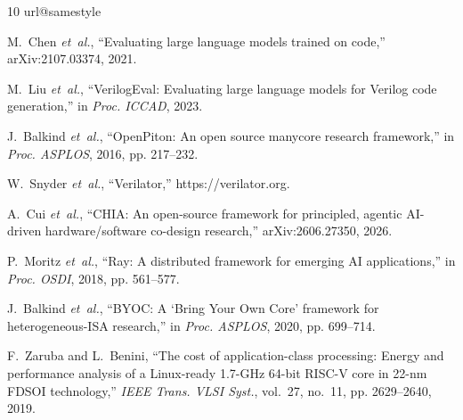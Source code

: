 \documentclass[10pt,conference,compsoc]{IEEEtran}
\begin{document}
\begin{thebibliography}{10}
\providecommand{\url}[1]{#1}
\csname url@samestyle\endcsname
\providecommand{\newblock}{\relax}
\providecommand{\bibinfo}[2]{#2}
\providecommand{\BIBentrySTDinterwordspacing}{\spaceskip=0pt\relax}
\providecommand{\BIBentryALTinterwordstretchfactor}{4}
\providecommand{\BIBentryALTinterwordspacing}{\spaceskip=\fontdimen2\font plus
\BIBentryALTinterwordstretchfactor\fontdimen3\font minus \fontdimen4\font\relax}
\providecommand{\BIBforeignlanguage}[2]{{%
\expandafter\ifx\csname l@#1\endcsname\relax
\typeout{** WARNING: IEEEtran.bst: No hyphenation pattern has been}%
\typeout{** loaded for the language `#1'. Using the pattern for}%
\typeout{** the default language instead.}%
\else
\language=\csname l@#1\endcsname
\fi
#2}}
\providecommand{\BIBdecl}{\relax}
\BIBdecl

M.~Chen \emph{et~al.}, ``Evaluating large language models trained on code,'' arXiv:2107.03374, 2021.

M.~Liu \emph{et~al.}, ``{VerilogEval}: Evaluating large language models for {Verilog} code generation,'' in \emph{Proc. ICCAD}, 2023.

J.~Balkind \emph{et~al.}, ``{OpenPiton}: An open source manycore research framework,'' in \emph{Proc. ASPLOS}, 2016, pp. 217--232.

W.~Snyder \emph{et~al.}, ``Verilator,'' \url{https://verilator.org}.

A.~Cui \emph{et~al.}, ``{CHIA}: An open-source framework for principled, agentic {AI}-driven hardware/software co-design research,'' arXiv:2606.27350, 2026.

P.~Moritz \emph{et~al.}, ``Ray: A distributed framework for emerging {AI} applications,'' in \emph{Proc. OSDI}, 2018, pp. 561--577.

J.~Balkind \emph{et~al.}, ``{BYOC}: A `{Bring Your Own Core}' framework for heterogeneous-{ISA} research,'' in \emph{Proc. ASPLOS}, 2020, pp. 699--714.

F.~Zaruba and L.~Benini, ``The cost of application-class processing: Energy and performance analysis of a {Linux}-ready 1.7-{GHz} 64-bit {RISC-V} core in 22-nm {FDSOI} technology,'' \emph{IEEE Trans. VLSI Syst.}, vol.~27, no.~11, pp. 2629--2640, 2019.


\end{thebibliography}
\end{document}
